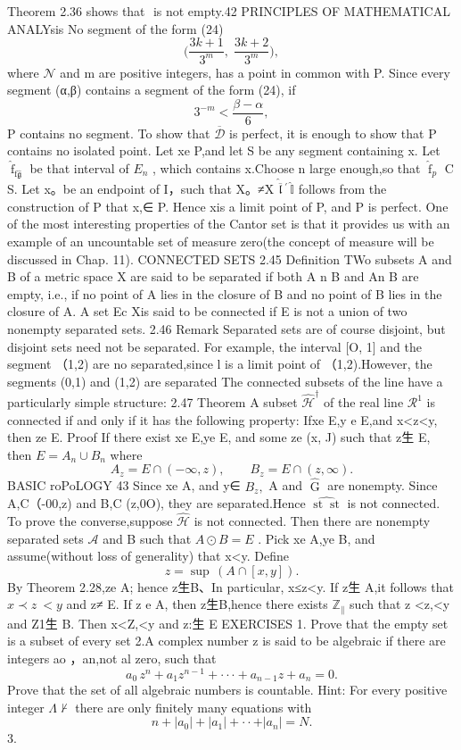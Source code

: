 Theorem 2.36 shows that $\stackrel{\mathcal{}}{\mathcal{}}$ is not empty.42 PRINCIPLES OF MATHEMATICAL ANALYsis No segment of the form (24) $$ \Big(\frac{3k+1}{3^{m}},\;\frac{3k+2}{3^{m}}\Big), $$ where ${\mathcal{N}}$ and m are positive integers, has a point in common with P. Since every segment (α,β) contains a segment of the form (24), if $$ 3^{-m}<{\frac{\beta-\alpha}{6}}, $$ P contains no segment. To show that $\overline{{{\mathcal{D}}}}$ is perfect, it is enough to show that P contains no isolated point. Let xe P,and let S be any segment containing x. Let ${\widehat{\operatorname{f}}}_{\mathrm{f}{\widehat{\mathfrak{g}}}}$ be that interval of $E_{n}$ , which contains x.Choose n large enough,so that ${\widehat{\operatorname{f}}}_{p}$ C S. Let x。be an endpoint of I，such that X。≠X $\hat{\overline{{\mathfrak{l}}}}\,^{\prime}\,\hat{\mathbb{I}}$ follows from the construction of P that x,∈ P. Hence xis a limit point of P, and P is perfect. One of the most interesting properties of the Cantor set is that it provides us with an example of an uncountable set of measure zero(the concept of measure will be discussed in Chap. 11). CONNECTED SETS 2.45 Definition TWo subsets A and B of a metric space X are said to be separated if both A n B and An B are empty, i.e., if no point of A lies in the closure of B and no point of B lies in the closure of A. A set Ec Xis said to be connected if E is not a union of two nonempty separated sets. 2.46 Remark Separated sets are of course disjoint, but disjoint sets need not be separated. For example, the interval [O, 1] and the segment （1,2) are no separated,since l is a limit point of （1,2).However, the segments (0,1) and (1,2) are separated The connected subsets of the line have a particularly simple structure: 2.47 Theorem A subset ${\widehat{\mathcal{H}}}^{\dagger}$ of the real line $\textstyle{\mathcal{R}}^{1}$ is connected if and only if it has the following property: Ifxe E,y e E,and x<z<y, then ze E. Proof If there exist xe E,ye E, and some ze (x, J) such that z生 E, then $E=A_{n}\cup B_{n}$ where $$ A_{z}=E\cap(-\infty,z),\qquad B_{z}=E\cap(z,\infty). $$BASIC roPoLOGY 43 Since xe A, and y∈ $B_{z},$ A and ${\widehat{\operatorname{G}}}$ are nonempty. Since A,C（-00,z) and B,C (z,0O), they are separated.Hence ${\widehat{\operatorname{st}\operatorname{st}}}$ is not connected. To prove the converse,suppose ${\widehat{\mathcal{H}}}$ is not connected. Then there are nonempty separated sets ${\mathcal{A}}$ and B such that $A\odot B=E$ . Pick xe A,ye B, and assume(without loss of generality) that x<y. Define $$ z=\operatorname{sup}\,(A\cap[x,y]). $$ By Theorem 2.28,ze A; hence z生B、In particular, x≤z<y. If z生 A,it follows that $x\prec z\ <y$ and z≠ E. If z e A, then z生B,hence there exists $\mathbb{Z}_{\parallel}$ such that z <z,<y and Z1生 B. Then x<Z,<y and z:生 E EXERCISES 1. Prove that the empty set is a subset of every set 2.A complex number z is said to be algebraic if there are integers ao ，an,not al zero, such that $$ a_{0}\,z^{n}+a_{1}z^{n-1}+\cdot\cdot\cdot+a_{n-1}z+a_{n}=0. $$ Prove that the set of all algebraic numbers is countable. Hint: For every positive integer $\Lambda\not\vdash$ there are only finitely many equations with $$ n+|a_{0}|+|a_{1}|+\cdot\cdot+|a_{n}|=N. $$ 3. 